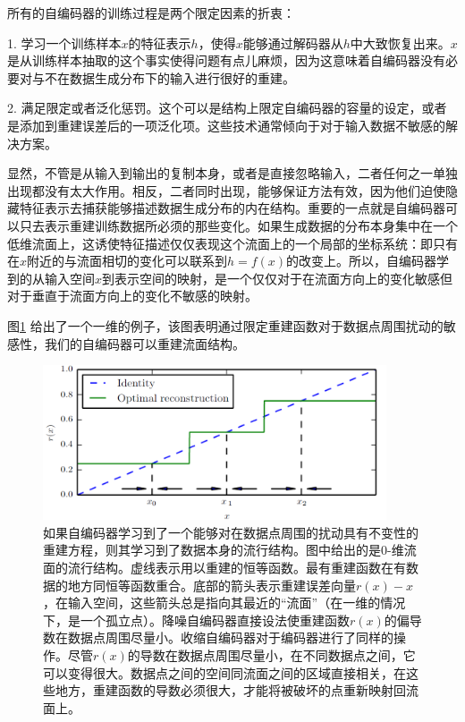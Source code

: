 所有的自编码器的训练过程是两个限定因素的折衷：

1. 学习一个训练样本$x$的特征表示$h$，使得$x$能够通过解码器从$h$中大致恢复出来。$x$是从训练样本抽取的这个事实使得问题有点儿麻烦，因为这意味着自编码器没有必要对与不在数据生成分布下的输入进行很好的重建。

2. 满足限定或者泛化惩罚。这个可以是结构上限定自编码器的容量的设定，或者是添加到重建误差后的一项泛化项。这些技术通常倾向于对于输入数据不敏感的解决方案。

显然，不管是从输入到输出的复制本身，或者是直接忽略输入，二者任何之一单独出现都没有太大作用。相反，二者同时出现，能够保证方法有效，因为他们迫使隐藏特征表示去捕获能够描述数据生成分布的内在结构。重要的一点就是自编码器可以只去表示重建训练数据所必须的那些变化。如果生成数据的分布本身集中在一个低维流面上，这诱使特征描述仅仅表现这个流面上的一个局部的坐标系统：即只有在$x$附近的与流面相切的变化可以联系到$h = f(x)$的改变上。所以，自编码器学到的从输入空间$x$到表示空间的映射，是一个仅仅对于在流面方向上的变化敏感但对于垂直于流面方向上的变化不敏感的映射。

图\ref{fig:14.7} 给出了一个一维的例子，该图表明通过限定重建函数对于数据点周围扰动的敏感性，我们的自编码器可以重建流面结构。
\begin{figure}[htbp] %
   \centering
   \includegraphics[width=4in]{fig/chap14/14_7.png} 
   \caption{如果自编码器学习到了一个能够对在数据点周围的扰动具有不变性的重建方程，则其学习到了数据本身的流行结构。图中给出的是0-维流面的流行结构。虚线表示用以重建的恒等函数。最有重建函数在有数据的地方同恒等函数重合。底部的箭头表示重建误差向量$r(x)-x$，在输入空间，这些箭头总是指向其最近的“流面”（在一维的情况下，是一个孤立点）。降噪自编码器直接设法使重建函数$r(x)$的偏导数在数据点周围尽量小。收缩自编码器对于编码器进行了同样的操作。尽管$r(x)$的导数在数据点周围尽量小，在不同数据点之间，它可以变得很大。数据点之间的空间同流面之间的区域直接相关，在这些地方，重建函数的导数必须很大，才能将被破坏的点重新映射回流面上。}
   \label{fig:14.7}
\end{figure}

